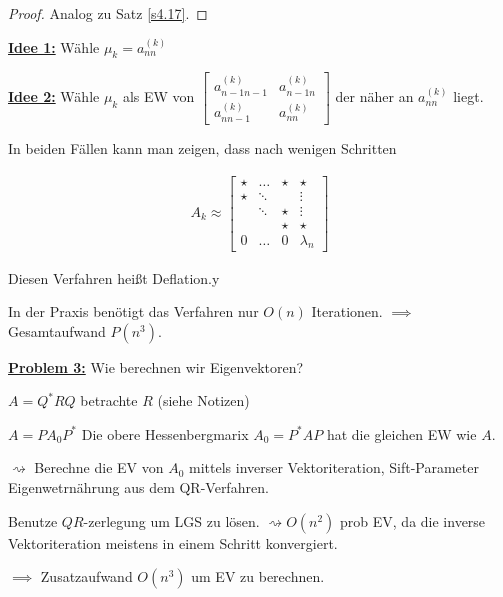 \documentclass{book}
\begin{document}
            \begin{proof}
                Analog zu Satz \ref{s4.17}.
            \end{proof}

            \underline{\textbf{Idee 1:}} Wähle $\mu_k=a_{nn}^{(k)}$

            \underline{\textbf{Idee 2:}} Wähle $\mu_k$ als EW von $\begin{bmatrix}
                a_{n-1n-1}^{(k)} & a_{n-1n}^{(k)}\\
                a_{nn-1}^{(k)} & a_{nn}^{(k)}
            \end{bmatrix}$
             der näher an $a_{nn}^{(k)}$ liegt.

            In beiden Fällen kann man zeigen, dass nach wenigen Schritten

            \begin{align*} %
                A_k\approx \begin{bmatrix}
                    \star &\dots&\star &\star\\
                    \star&\ddots&&\vdots\\
                    &\ddots&\star&\vdots\\
                    &&\star&\star\\
                    0&\dots&0&\lambda_n
                \end{bmatrix}
            \end{align*}

            Diesen Verfahren heißt Deflation.y

            In der Praxis benötigt das Verfahren nur $O(n)$ Iterationen.
            $\implies$ Gesamtaufwand $P(n^3)$.

            \underline{\textbf{Problem 3:}} Wie berechnen wir Eigenvektoren?

            $A=Q^*RQ$ betrachte $R$ (siehe Notizen)

            $A=PA_0P^*$ Die obere Hessenbergmarix $A_0=P^* A P$ hat die gleichen EW wie $A$.

            $\rightsquigarrow$ Berechne die EV von $A_0$ mittels inverser Vektoriteration,
            Sift-Parameter Eigenwetrnährung aus dem QR-Verfahren.

            Benutze $QR$-zerlegung um LGS zu lösen. $\rightsquigarrow O(n^2)$ prob EV, da die inverse Vektoriteration meistens in einem Schritt konvergiert.

            $\implies $ Zusatzaufwand $O(n^3)$ um EV zu berechnen.
\end{document}
